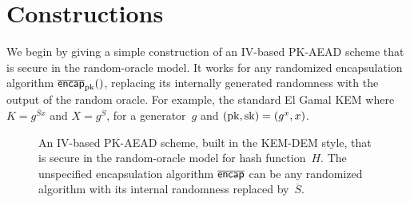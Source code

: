 \section{Constructions}
\label{sec:constructions}
We begin by giving a simple construction of an IV-based PK-AEAD scheme that is secure in the random-oracle model. It works for any randomized encapsulation algorithm $\OLencapprim{\pk}{}$, replacing its internally generated randomness with the output of the random oracle.  For example, the standard El Gamal KEM where $K=g^{\overline{S}x}$ and $X=g^{\overline{S}}$, for a generator~$g$ and $(\mathrm{pk},\mathrm{sk})=(g^x,x)$.
%

\begin{figure}
\begin{center}

\medskip
{} 
\caption{An IV-based PK-AEAD scheme, built in the KEM-DEM style, that is secure in the random-oracle model for hash function~$H$. The unspecified encapsulation algorithm $\overline{\mathsf{encap}}$ can be any randomized algorithm with its internal randomness replaced by~$\overline{S}$.
}
\label{fig:ro-kem-dem-construction}
\end{center}
\end{figure}
